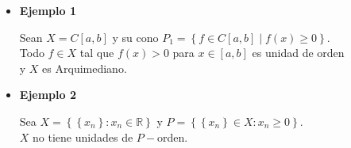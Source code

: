 







 





\begin{frame}
\begin{itemize}
	 \item \textbf{Ejemplo 1}
	\begin{block}{}%
	Sean $X=C[a,b]$ y su cono  $P_{1} =\left\lbrace f \in C[a,b] \mid f(x) \geq 0 \right\rbrace  $.\\  Todo $ f \in X   $ tal que $ f(x)>0 $ para  $ x \in [a,b] $ es unidad de orden\\ y $ X $ es Arquimediano.
\end{block}
	\item 
	 \textbf{Ejemplo 2}
		\begin{block}{}
		Sea $ X = \left\lbrace \left\lbrace x_n \right\rbrace  : x_n \in \mathbb{R} \right\rbrace  $ y $ P=  \left\lbrace \left\lbrace x_n \right\rbrace \in X : x_n \geq 0 \right\rbrace  $.\\
		$ X $ no tiene unidades de $ P- $orden.\\
	\end{block}
  
\end{itemize}

\end{frame}
